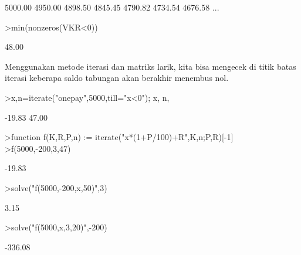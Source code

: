 \documentclass[a4paper,11pt,oneside,enabledeprecatedfontcommands]{scrbook}
\newenvironment{eulernotebook}{}{}
\newenvironment{eulercomment}{\par\medskip\noindent}{\par\medskip}
\begin{document}
\begin{eulernotebook}
\begin{euleroutput}
    5000.00     4950.00     4898.50     4845.45     4790.82     4734.54     4676.58     ...
\end{euleroutput}
\begin{eulerprompt}
>min(nonzeros(VKR<0))
\end{eulerprompt}
\begin{euleroutput}
      48.00 
\end{euleroutput}
\begin{eulercomment}
Menggunakan metode iterasi dan matriks larik, kita bisa mengecek di titik batas iterasi keberapa saldo tabungan akan berakhir menembus nol.
\end{eulercomment}
\begin{eulerprompt}
>{x,n}=iterate("onepay",5000,till="x<0"); x, n,
\end{eulerprompt}
\begin{euleroutput}
     -19.83 
      47.00 
\end{euleroutput}
\begin{eulerprompt}
>function f(K,R,P,n) := iterate("x*(1+P/100)+R",K,n;P,R)[-1]
>f(5000,-200,3,47)
\end{eulerprompt}
\begin{euleroutput}
     -19.83 
\end{euleroutput}
\begin{eulerprompt}
>solve("f(5000,-200,x,50)",3)
\end{eulerprompt}
\begin{euleroutput}
       3.15 
\end{euleroutput}
\begin{eulerprompt}
>solve("f(5000,x,3,20)",-200)
\end{eulerprompt}
\begin{euleroutput}
    -336.08 
\end{euleroutput}


\end{eulernotebook}
\end{document}
